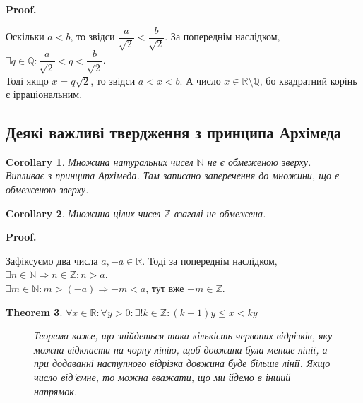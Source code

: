 \documentclass[a4paper, 14pt]{article}
\makeatletter
\def\qed{$\blacksquare$}
\theoremstyle{theoremdd}
\newtheorem{theorem}{Theorem}[subsection]
\theoremstyle{theoremdd}
\theoremstyle{theoremdd}
\theoremstyle{theoremdd}
\theoremstyle{theoremdd}
\theoremstyle{theoremdd}
\theoremstyle{theoremdd}
\theoremstyle{theoremdd}
\newtheorem{corollary}[theorem]{Corollary}
\renewenvironment{proof}[1][Proof.\\]{\par
\pushQED{\hfill \qed}%
\normalfont \topsep6\p@\@plus6\p@\relax
\trivlist
\item\relax
{\bfseries
#1\@addpunct{.}}\hspace\labelsep\ignorespaces
}{%
\popQED\endtrivlist\@endpefalse
}
\makeatother
\begin{document}
	\begin{proof}
	Оскільки $a < b$, то звідси $\dfrac{a}{\sqrt{2}} < \dfrac{b}{\sqrt{2}}$. За попереднім наслідком, $\exists q \in \mathbb{Q}: \dfrac{a}{\sqrt{2}} < q < \dfrac{b}{\sqrt{2}}$.\\
	Тоді якщо $x = q \sqrt{2}$, то звідси $a < x < b$. А число $x \in \mathbb{R} \setminus \mathbb{Q}$, бо квадратний корінь є ірраціональним.
	\end{proof}

	\subsection{Деякі важливі твердження з принципа Архімеда}
	\begin{corollary}
	Множина натуральних чисел $\mathbb{N}$ не є обмеженою зверху.\\
	\textit{Випливає з принципа Архімеда. Там записано заперечення до множини, що є обмеженою зверху.}
	\end{corollary}
	
	\begin{corollary}
	Множина цілих чисел $\mathbb{Z}$ взагалі не обмежена.
	\end{corollary}
	
	\begin{proof}
	Зафіксуємо два числа $a,-a \in \mathbb{R}$. Тоді за попереднім наслідком,\\
	$\exists n \in \mathbb{N} \Rightarrow n \in \mathbb{Z}: n > a$.\\
	$\exists m \in \mathbb{N}: m > (-a) \Rightarrow -m < a$, тут вже $-m \in \mathbb{Z}$.
	\end{proof}
	
	\begin{theorem} $\forall x \in \mathbb{R}: \forall y > 0: \exists ! k \in \mathbb{Z}: (k-1)y \leq x < ky$
	\begin{figure}[H]
	\centering
	\qquad
	\caption*{Теорема каже, що знійдеться така кількість червоних відрізків, яку можна відкласти на чорну лінію, щоб довжина була менше лінії, а при додаванні наступного відрізка довжина буде більше лінії. Якщо число від'ємне, то можна вважати, що ми йдемо в інший напрямок.}
	\end{figure}
	\end{theorem}
	
\end{document}
